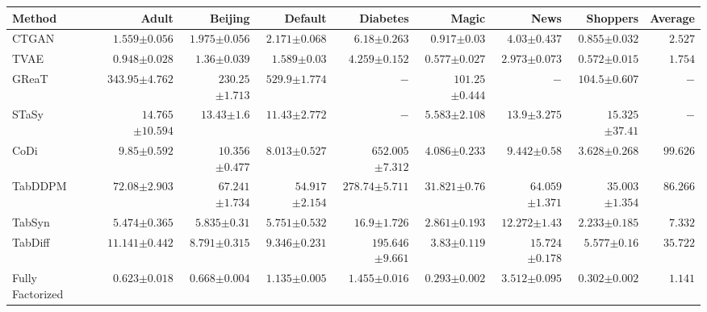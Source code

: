 \begin{tabular}{lrrrrrrr|r}
    \toprule[0.8pt]
     \textbf{Method} & \textbf{Adult} & \textbf{Beijing} & \textbf{Default} & \textbf{Diabetes} & \textbf{Magic} & \textbf{News} & \textbf{Shoppers} & \textbf{Average} \\
    \midrule 
    CTGAN & $1.559${\tiny${\pm 0.056}$} & $1.975${\tiny${\pm 0.056}$} & $2.171${\tiny${\pm 0.068}$} & $6.18${\tiny${\pm 0.263}$} & $0.917${\tiny${\pm 0.03}$} & $4.03${\tiny${\pm 0.437}$} & $0.855${\tiny${\pm 0.032}$} & $2.527$ \\
    TVAE & $0.948${\tiny${\pm 0.028}$} & $1.36${\tiny${\pm 0.039}$} & $1.589${\tiny${\pm 0.03}$} & $4.259${\tiny${\pm 0.152}$} & $0.577${\tiny${\pm 0.027}$} & $2.973${\tiny${\pm 0.073}$} & $0.572${\tiny${\pm 0.015}$} & $1.754$ \\
    GReaT & $343.95${\tiny${\pm 4.762}$} & $230.25${\tiny${\pm 1.713}$} & $529.9${\tiny${\pm 1.774}$} & $-$ & $101.25${\tiny${\pm 0.444}$} & $-$ & $104.5${\tiny${\pm 0.607}$} & $-$ \\
    STaSy & $14.765${\tiny${\pm 10.594}$} & $13.43${\tiny${\pm 1.6}$} & $11.43${\tiny${\pm 2.772}$} & $-$ & $5.583${\tiny${\pm 2.108}$} & $13.9${\tiny${\pm 3.275}$} & $15.325${\tiny${\pm 37.41}$} & $-$ \\
    CoDi & $9.85${\tiny${\pm 0.592}$} & $10.356${\tiny${\pm 0.477}$} & $8.013${\tiny${\pm 0.527}$} & $652.005${\tiny${\pm 7.312}$} & $4.086${\tiny${\pm 0.233}$} & $9.442${\tiny${\pm 0.58}$} & $3.628${\tiny${\pm 0.268}$} & $99.626$ \\
    TabDDPM & $72.08${\tiny${\pm 2.903}$} & $67.241${\tiny${\pm 1.734}$} & $54.917${\tiny${\pm 2.154}$} & $278.74${\tiny${\pm 5.711}$} & $31.821${\tiny${\pm 0.76}$} & $64.059${\tiny${\pm 1.371}$} & $35.003${\tiny${\pm 1.354}$} & $86.266$ \\
    TabSyn & $5.474${\tiny${\pm 0.365}$} & $5.835${\tiny${\pm 0.31}$} & $5.751${\tiny${\pm 0.532}$} & $16.9${\tiny${\pm 1.726}$} & $2.861${\tiny${\pm 0.193}$} & $12.272${\tiny${\pm 1.43}$} & $2.233${\tiny${\pm 0.185}$} & $7.332$ \\
    TabDiff & $11.141${\tiny${\pm 0.442}$} & $8.791${\tiny${\pm 0.315}$} & $9.346${\tiny${\pm 0.231}$} & $195.646${\tiny${\pm 9.661}$} & $3.83${\tiny${\pm 0.119}$} & $15.724${\tiny${\pm 0.178}$} & $5.577${\tiny${\pm 0.16}$} & $35.722$ \\
    \midrule
    Fully Factorized & $0.623${\tiny${\pm 0.018}$} & $0.668${\tiny${\pm 0.004}$} & $1.135${\tiny${\pm 0.005}$} & $1.455${\tiny${\pm 0.016}$} & $0.293${\tiny${\pm 0.002}$} & $3.512${\tiny${\pm 0.095}$} & $0.302${\tiny${\pm 0.002}$} & $1.141$ \\

\end{tabular}
